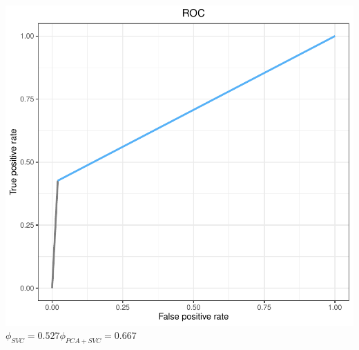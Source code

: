 \documentclass[compress]{beamer}
\begin{document}
\begin{frame}
\begin{columns}
\begin{center}
\includegraphics[width=0.5\linewidth]{Pic/SVM_PCA_ROC.pdf}\\
$\phi_{SVC}=0.527$\quad$\phi_{PCA+SVC}=0.667$
\end{center}
\end{columns}
\end{frame}
\end{document}
